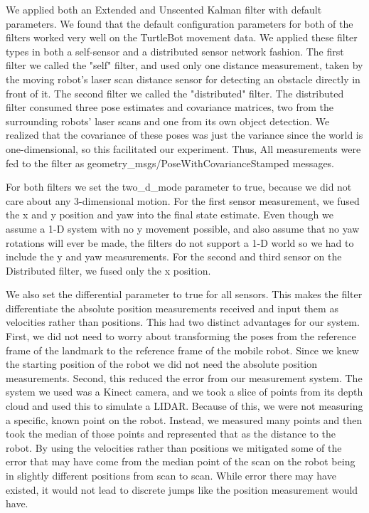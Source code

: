 \documentclass[conference]{IEEEtran} \usepackage[T1]{fontenc} \usepackage[backend=biber, style=ieee]{biblatex}
\begin{document}
We applied both an Extended and Unscented Kalman filter with default parameters. We found that the default configuration 
parameters for both of the filters worked very well on the TurtleBot movement data. We applied these filter types in both
a self-sensor and a distributed sensor network fashion. The first filter we called the "self" filter, and
used only one distance measurement, taken by the moving robot's laser scan distance sensor for detecting an obstacle directly in front 
of it. The second filter we called the "distributed" filter. The distributed filter consumed three pose estimates and covariance matrices, 
two from the surrounding robots' laser scans and one from its own object detection. We realized that the covariance of these poses was just 
the variance since the world is one-dimensional, so this facilitated our experiment. Thus,  All measurements were fed to the filter as geometry\_msgs/PoseWithCovarianceStamped messages.

For both filters we set the two\_d\_mode parameter to true, because we did not care about any 3-dimensional motion. For the first
sensor measurement, we fused the x and y position and yaw into the final state estimate. Even though we assume a 1-D
system with no y movement possible, and also assume that no yaw rotations will ever be made, the filters do not support
a 1-D world so we had to include the y and yaw measurements. For the second and third sensor on the Distributed filter,
we fused only the x position.

We also set the differential parameter to true for all sensors. This makes the filter differentiate the absolute
position measurements received and input them as velocities rather than positions. This had two distinct advantages for
our system. First, we did not need to worry about transforming the poses from the reference frame of the landmark to the
reference frame of the mobile robot. Since we knew the starting position of the robot we did not need the absolute
position measurements. Second, this reduced the error from our measurement system. The system we used was a Kinect
camera, and we took a slice of points from its depth cloud and used this to simulate a LIDAR. Because of this, we were
not measuring a specific, known point on the robot. Instead, we measured many points and then took the median of those
points and represented that as the distance to the robot. By using the velocities rather than positions we mitigated
some of the error that may have come from the median point of the scan on the robot being in slightly different
positions from scan to scan. While error there may have existed, it would not lead to discrete jumps like the position
measurement would have.
\end{document}
